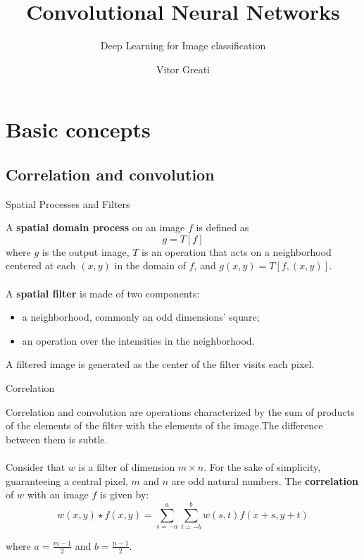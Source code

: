 \documentclass{beamer}
\title{Convolutional Neural Networks}
\subtitle{Deep Learning for Image classification}
\author{Vitor Greati\inst{1}}
\institute[]
{
	\inst{1}%
	Federal University of Rio Grande do Norte
}
\date{}
\begin{document}
\frame{\titlepage}


\section{Basic concepts}

    \subsection{Correlation and convolution}
    \begin{frame}{Spatial Processes and Filters}

        A \textbf{spatial domain process} on an image $f$ is defined as
        \[
            g = T[f]
        \]
        where $g$ is the output image, $T$ is an operation that
        acts on a neighborhood centered at each $(x,y)$ in the domain
        of $f$, and $g(x,y) = T[f,(x,y)]$.\\~\\

        A \textbf{spatial filter} is made of two components:
        \begin{itemize}
            \item a neighborhood, commonly an odd dimensions' square;
            \item an operation over the intensities in the neighborhood.
        \end{itemize}
       
        A filtered image is generated as the center of the filter
        visits each pixel.

    \end{frame}

    \begin{frame}{Correlation}

        Correlation and convolution are operations characterized by
        the sum of products of the elements of the filter
        with the elements of the image.The difference between them
        is subtle.\\~\\

        Consider that $w$ is a filter of dimension $m \times n$. For the sake
        of simplicity, guaranteeing a central pixel, $m$ and $n$ are odd natural numbers.
        The \textbf{correlation} of $w$ with an image $f$ is given by:
        \begin{equation}
            w(x,y) \star f(x,y) = \sum\limits_{s=-a}^{a} \sum\limits_{t=-b}^{b} w(s,t)f(x+s, y+t)
        \end{equation}
        
        where $a = \frac{m-1}{2}$ and $b = \frac{n-1}{2}$.
    \end{frame}
\end{document}
